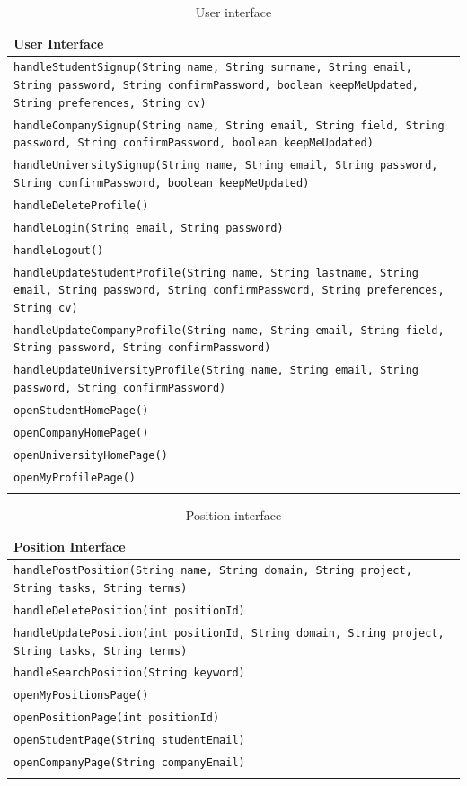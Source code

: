 \renewcommand{\arraystretch}{1.5}
\begin{longtable}{|p{14.5cm}|}
    \hline
    \cellcolor{custompurple}\textbf{User Interface} \\ \hline
    \texttt{handleStudentSignup(String name, String surname, String email, String password, String confirmPassword, boolean keepMeUpdated, String preferences, String cv)} \\ \hline
    \texttt{handleCompanySignup(String name, String email, String field, String password, String confirmPassword, boolean keepMeUpdated)} \\ \hline
    \texttt{handleUniversitySignup(String name, String email, String password, String confirmPassword, boolean keepMeUpdated)} \\ \hline
    \texttt{handleDeleteProfile()} \\ \hline
    \texttt{handleLogin(String email, String password)} \\ \hline
    \texttt{handleLogout()} \\ \hline
    \texttt{handleUpdateStudentProfile(String name, String lastname, String email, String password, String confirmPassword, String preferences, String cv)} \\ \hline
    \texttt{handleUpdateCompanyProfile(String name, String email, String field, String password, String confirmPassword)} \\ \hline
    \texttt{handleUpdateUniversityProfile(String name, String email, String password, String confirmPassword)} \\ \hline
    \texttt{openStudentHomePage()} \\ \hline
    \texttt{openCompanyHomePage()} \\ \hline
    \texttt{openUniversityHomePage()} \\ \hline
    \texttt{openMyProfilePage()} \\ \hline
\caption{User interface}
\end{longtable}

\renewcommand{\arraystretch}{1.5}
\begin{longtable}{|p{14.5cm}|}
    \hline
    \cellcolor{customblue}\textbf{Position Interface} \\ \hline
    \texttt{handlePostPosition(String name, String domain, String project, String tasks, String terms)} \\ \hline
    \texttt{handleDeletePosition(int positionId)} \\ \hline
    \texttt{handleUpdatePosition(int positionId, String domain, String project, String tasks, String terms)} \\ \hline
    \texttt{handleSearchPosition(String keyword)} \\ \hline
    \texttt{openMyPositionsPage()} \\ \hline
    \texttt{openPositionPage(int positionId)} \\ \hline
    \texttt{openStudentPage(String studentEmail)} \\ \hline
    \texttt{openCompanyPage(String companyEmail)} \\ \hline
\caption{Position interface}
\end{longtable}

